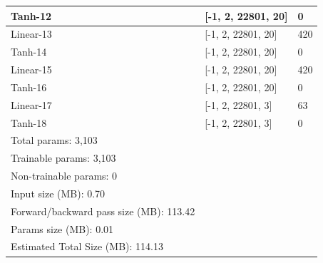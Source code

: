\documentclass{article}
\begin{document}
\begin{table}[H]
\begin{tabular}{lll}
		\hline
		\multicolumn{1}{|l|}{Tanh-12}                &
		\multicolumn{1}{l|}{{[}-1, 2, 22801, 20{]}}  &
		\multicolumn{1}{l|}{0}                         \\
		\hline
		\multicolumn{1}{|l|}{Linear-13}              &
		\multicolumn{1}{l|}{{[}-1, 2, 22801, 20{]}}  &
		\multicolumn{1}{l|}{420}                       \\
		\hline
		\multicolumn{1}{|l|}{Tanh-14}                &
		\multicolumn{1}{l|}{{[}-1, 2, 22801, 20{]}}  &
		\multicolumn{1}{l|}{0}                         \\
		\hline
		\multicolumn{1}{|l|}{Linear-15}              &
		\multicolumn{1}{l|}{{[}-1, 2, 22801, 20{]}}  &
		\multicolumn{1}{l|}{420}                       \\
		\hline
		\multicolumn{1}{|l|}{Tanh-16}                &
		\multicolumn{1}{l|}{{[}-1, 2, 22801, 20{]}}  &
		\multicolumn{1}{l|}{0}                         \\
		\hline
		\multicolumn{1}{|l|}{Linear-17}              &
		\multicolumn{1}{l|}{{[}-1, 2, 22801, 3{]}}   &
		\multicolumn{1}{l|}{63}                        \\
		\hline
		\multicolumn{1}{|l|}{Tanh-18}                &
		\multicolumn{1}{l|}{{[}-1, 2, 22801, 3{]}}   &
		\multicolumn{1}{l|}{0}                         \\
		\hline
		\multicolumn{1}{|l}{Total params: 3,103}     &
		                                             &
		\multicolumn{1}{l|}{}                          \\
		\multicolumn{1}{|l}{Trainable params: 3,103} &
		                                             &
		\multicolumn{1}{l|}{}                          \\
		\multicolumn{1}{|l}{Non-trainable params: 0} &
		                                             &
		\multicolumn{1}{l|}{}                          \\ \hline
		Input size (MB): 0.70                        &
		                                             &
		\\
		Forward/backward pass size (MB): 113.42      &
		                                             &
		\\
		Params size (MB): 0.01                       &
		                                             &
		\\
		Estimated Total Size (MB): 114.13            &
		                                             &
	\end{tabular}
\end{table}
\end{document}
